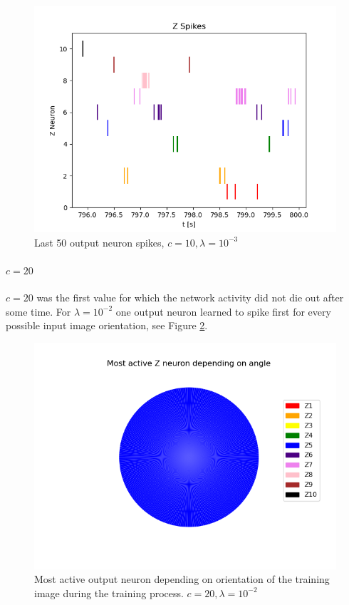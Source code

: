\begin{figure}
  \includegraphics[width=\linewidth]{figures/angleNetwork/c10_3_50LastZSpikes.png}
  \caption{Last 50 output neuron spikes, $c = 10, \lambda = 10^{-3}$}
  \label{fig:c10LastSpikes}
\end{figure}

\paragraph{$c = 20$}
$c = 20$ was the first value for which the network activity did not die out after some time. For $\lambda = 10^{-2}$ one output neuron learned to spike first for every possible input image orientation, see Figure \ref{fig:c20_2Pie}. 

\begin{figure}
  \includegraphics[width=\linewidth]{figures/angleNetwork/c20_2pie.png}
  \caption{Most active output neuron depending on orientation of the training image during the training process. $c = 20, \lambda = 10^{-2}$}
  \label{fig:c20_2Pie}
\end{figure}

